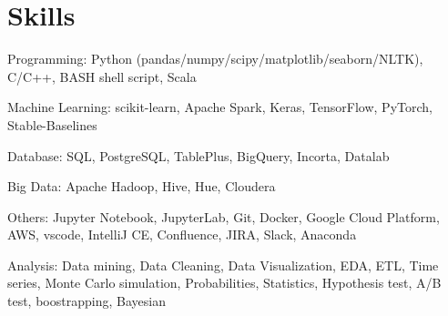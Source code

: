 \documentclass[letterpaper]{deedy-resume-openfont}
\begin{document}
\section{Skills}
\location{}
\vspace{-0.4cm}
\begin{tightemize}
    \item Programming: Python (pandas/numpy/scipy/matplotlib/seaborn/NLTK), C/C++, BASH shell script, Scala
    \item Machine Learning: scikit-learn, Apache Spark, Keras, TensorFlow, PyTorch, Stable-Baselines
    \item Database: SQL, PostgreSQL, TablePlus, BigQuery, Incorta, Datalab
    \item Big Data: Apache Hadoop, Hive, Hue, Cloudera
    \item Others: Jupyter Notebook, JupyterLab, Git, Docker, Google Cloud Platform, AWS, vscode, IntelliJ CE, Confluence, JIRA, Slack, Anaconda
    \item Analysis: Data mining, Data Cleaning, Data Visualization, EDA, ETL, Time series, Monte Carlo simulation, Probabilities, Statistics, Hypothesis test, A/B test, boostrapping, Bayesian
\end{tightemize}
\sectionsep



%     
\end{document}
